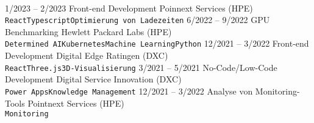 \documentclass[9pt]{developercv} %
\begin{document}
\vspace{0.5cm}



\begin{minipage}[t]{0.4\textwidth} %
	\vspace{-\baselineskip} %

	\lorem \lorem \lorem \lorem \lorem\\ %
\end{minipage}
\hfill %
\begin{minipage}[t]{0.5\textwidth} %
	\vspace{-\baselineskip} %
	\begin{barchart}{5.5}
	\end{barchart}
\end{minipage}




\begin{entrylist}
	\entry
	{1/2023 -- 2/2023}
	{Front-end Development}
	{Poinnext Services (HPE)}
	{\lorem\\ \texttt{React}\slashsep\texttt{Typescript}\slashsep\texttt{Optimierung von Ladezeiten}}
	\entry
	{6/2022 -- 9/2022}
	{GPU Benchmarking}
	{Hewlett Packard Labs (HPE)}
	{\lorem\\ \texttt{Determined AI}\slashsep\texttt{Kubernetes}\slashsep\texttt{Machine Learning}\slashsep\texttt{Python}}
	\entry
	{12/2021 -- 3/2022}
	{Front-end Development}
	{Digital Edge Ratingen (DXC)}
	{\lorem\\ \texttt{React}\slashsep\texttt{Three.js}\slashsep\texttt{3D-Visualisierung}}
	\entry
	{3/2021 -- 5/2021}
	{No-Code/Low-Code Development}
	{Digital Service Innovation (DXC)}
	{\lorem\\ \texttt{Power Apps}\slashsep\texttt{Knowledge Management}}
	\entry
	{12/2021 -- 3/2022}
	{Analyse von Monitoring-Tools}
	{Pointnext Services (HPE)}
	{\lorem\\ \texttt{Monitoring}}
\end{entrylist}
\end{document}
